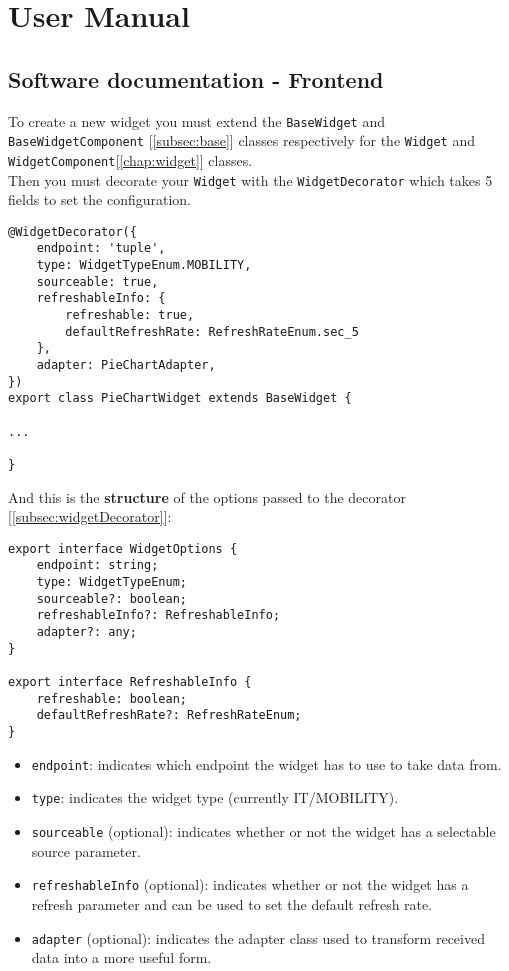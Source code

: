\chapter{User Manual}
\section{Software documentation - Frontend}
To create a new widget you must extend the \verb|BaseWidget| and \verb|BaseWidgetComponent| [\ref{subsec:base}] classes respectively for the \verb|Widget| and \verb|WidgetComponent|[\ref{chap:widget}] classes.\\
Then you must decorate your \verb|Widget| with the \verb|WidgetDecorator| which takes 5 fields to set the configuration.
\begin{lstlisting}[caption={PieChartWidget example}, style=javaScriptCode]
@WidgetDecorator({
    endpoint: 'tuple', 
    type: WidgetTypeEnum.MOBILITY,
    sourceable: true,
    refreshableInfo: {
        refreshable: true,
        defaultRefreshRate: RefreshRateEnum.sec_5
    },
    adapter: PieChartAdapter,
})
export class PieChartWidget extends BaseWidget {

...

}
\end{lstlisting}
And this is the \textbf{structure} of the options passed to the decorator [\ref{subsec:widgetDecorator}]:
\begin{lstlisting}[caption={Structure of WidgetOptions}, style=javaScriptCode]
export interface WidgetOptions {
    endpoint: string;
    type: WidgetTypeEnum;
    sourceable?: boolean;
    refreshableInfo?: RefreshableInfo; 
    adapter?: any;
}

export interface RefreshableInfo {
    refreshable: boolean;
    defaultRefreshRate?: RefreshRateEnum;
}
\end{lstlisting}
\begin{itemize}
    \item \verb|endpoint|: indicates which endpoint the widget has to use to take data from.
    \item \verb|type|: indicates the widget type (currently IT/MOBILITY).
    \item \verb|sourceable| (optional): indicates whether or not the widget has a selectable source parameter.
    \item \verb|refreshableInfo| (optional): indicates whether or not the widget has a refresh parameter and can be used to set the default refresh rate.
    \item \verb|adapter| (optional): indicates the adapter class used to transform received data into a more useful form.
\end{itemize}

